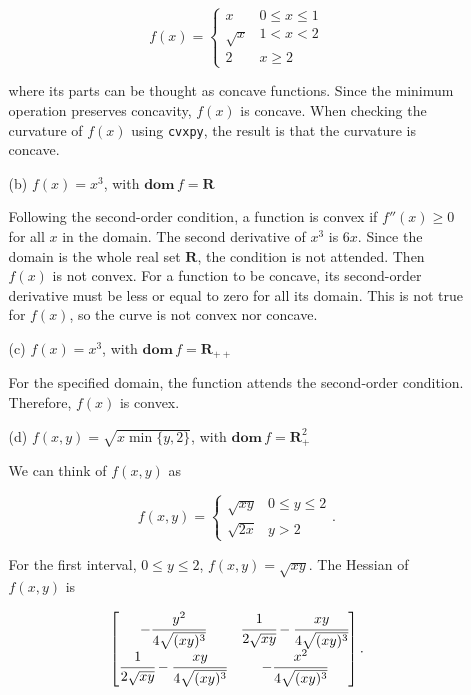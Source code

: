 \documentclass[11pt,a4paper]{article}
\begin{document}
\begin{itemize}
\begin{itemize}
        \begin{equation*}
            f(x) = \begin{cases}
                x & 0 \leq x \leq 1\\
                \sqrt{x} & 1 < x < 2\\
                2 & x \geq 2
            \end{cases}
        \end{equation*}

        \noindent where its parts can be thought as concave functions. Since the minimum operation preserves concavity, $f(x)$ is concave. When checking the curvature of $f(x)$ using \texttt{cvxpy}, the result is that the curvature is concave. 

        \item[(b)] $f(x) = x^3$, with $\textbf{dom} \, f = \mathbf{R}$
        
        Following the second-order condition, a function is convex if $f''(x) \geq 0$ for all $x$ in the domain. The second derivative of $x^3$ is $6x$. Since the domain is the whole real set $\mathbf{R}$, the condition is not attended. Then $f(x)$ is not convex. For a function to be concave, its second-order derivative must be less or equal to zero for all its domain. This is not true for $f(x)$, so the curve is not convex nor concave. 

        \item[(c)] $f(x) = x^3$, with $\textbf{dom} \, f = \mathbf{R}_{++}$
        
        For the specified domain, the function attends the second-order condition. Therefore, $f(x)$ is convex. 

        \item[(d)] $f(x,y) = \sqrt{x \min\{y,2\}}$, with $\mathbf{dom} \, f = \mathbf{R}_+^2$
        
        We can think of $f(x,y)$ as

        \begin{equation*}
            f(x,y) = \begin{cases}
                \sqrt{xy} & 0 \leq y \leq 2\\
                \sqrt{2x} & y > 2
            \end{cases}.
        \end{equation*}

        For the first interval, $0 \leq y \leq 2$, $f(x,y) = \sqrt{xy}$. The Hessian of $f(x,y)$ is

        \begin{equation*}
            \begin{bmatrix}
                    -\cfrac{y^2}{4 \sqrt{(x y)^3}} & \cfrac{1}{2 \sqrt{x y}} - \cfrac{x y}{4 \sqrt{(x y)^3}} \\
                    \cfrac{1}{2 \sqrt{x y}} - \cfrac{x y}{4 \sqrt{(x y)^3}} & -\cfrac{x^2}{4 \sqrt{(x y)^3}}
            \end{bmatrix}.
        \end{equation*}


\end{itemize}
\end{itemize}
\end{document}

